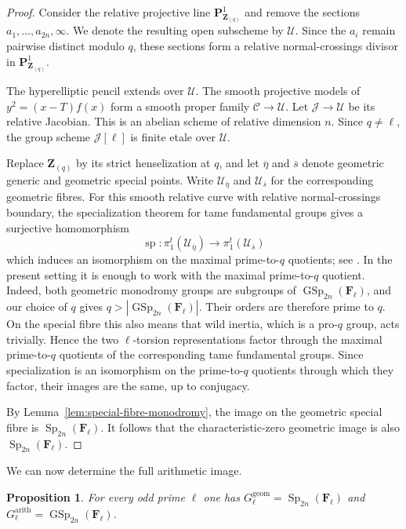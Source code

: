 \documentclass[11pt,hidelinks]{amsart}
\newtheorem{proposition}[theorem]{Proposition}
\newcommand{\Z}{\mathbf Z}
\newcommand{\F}{\mathbf F}
\newcommand{\GSp}{\operatorname{GSp}}
\newcommand{\Sp}{\operatorname{Sp}}
\newcommand{\PP}{\mathbf P}
\begin{document}
\begin{proof}
Consider the relative projective line
$\PP^1_{\Z_{(q)}}$ and remove the sections
$a_1,\ldots,a_{2n},\infty$.  We denote the resulting open subscheme by
$\mathscr U$.  Since the $a_i$ remain pairwise distinct modulo $q$,
these sections form a relative normal-crossings divisor in
$\PP^1_{\Z_{(q)}}$.

The hyperelliptic pencil extends over $\mathscr U$. The smooth
projective models of $y^2=(x-T)f(x)$ form a smooth proper family
$\mathscr C\rightarrow\mathscr U$.  Let
$\mathscr J\rightarrow\mathscr U$ be its relative Jacobian.  This is
an abelian scheme of relative dimension $n$.  Since $q\neq\ell$, the
group scheme $\mathscr J[\ell]$ is finite etale over $\mathscr U$.

Replace
$\Z_{(q)}$ by its strict henselization at $q$, and let
$\overline\eta$ and $\overline s$ denote geometric generic and
geometric special points.  Write
$\mathscr U_{\overline\eta}$ and $\mathscr U_{\overline s}$ for the
corresponding geometric fibres. For this smooth relative curve with relative normal-crossings boundary,
the specialization theorem for tame fundamental groups gives a
surjective homomorphism
\[
\operatorname{sp}\colon
\pi_1^{t}(\mathscr U_{\overline\eta})
\longrightarrow
\pi_1^{t}(\mathscr U_{\overline s})
\]
which induces an isomorphism on the maximal prime-to-$q$ quotients;
see \cite[Expos\'e XIII, \S2.10 and Corollaire~2.12]{SGA1}. In the present setting it is enough to work with the maximal prime-to-$q$ quotient.
Indeed, both geometric monodromy groups are subgroups of
$\GSp_{2n}(\F_\ell)$, and our choice of $q$ gives
$q>|\GSp_{2n}(\F_\ell)|$.  Their orders are therefore prime to $q$.
On the special fibre this also means that wild inertia, which is a
pro-$q$ group, acts trivially.  Hence the two $\ell$-torsion
representations factor through the maximal prime-to-$q$ quotients of
the corresponding tame fundamental groups. Since specialization is an isomorphism
on the prime-to-$q$ quotients through which they factor, their images
are the same, up to conjugacy.

By Lemma~\ref{lem:special-fibre-monodromy}, the image on the geometric
special fibre is $\Sp_{2n}(\F_\ell)$.  It follows that the
characteristic-zero geometric image is also
$\Sp_{2n}(\F_\ell)$.
\end{proof}

We can now determine the full arithmetic image.

\begin{proposition}\label{prop:generic-image}
For every odd prime $\ell$ one has
$G^{\mathrm{geom}}_\ell=\Sp_{2n}(\F_\ell)$ and
$G^{\mathrm{arith}}_\ell=\GSp_{2n}(\F_\ell)$.
\end{proposition}
\end{document}
